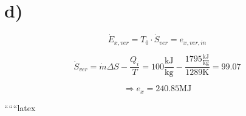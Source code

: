 

\section*{d)}

\[
\dot{E}_{x,ver} = T_0 \cdot \dot{S}_{ver} = e_{x,ver,in}
\]

\[
\dot{S}_{ver} = \dot{m} \Delta S - \frac{Q_i}{T} = 100 \frac{\text{kJ}}{\text{kg}} - \frac{1795 \frac{\text{kJ}}{\text{kg}}}{1289 \text{K}} = 99.07
\]

\[
\Rightarrow e_x = 240.85 \text{MJ}
\]

``````latex
